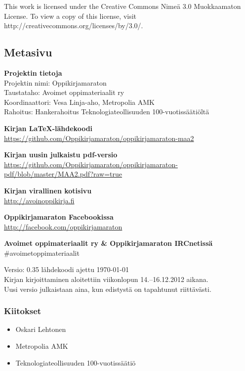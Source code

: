 This work is licensed under the Creative Commons Nimeä 3.0 Muokkaamaton License. To view a copy of this license, visit http://creativecommons.org/licenses/by/3.0/.

\newpage
\subsection*{Metasivu}

\textbf{Projektin tietoja} \\
Projektin nimi: Oppikirjamaraton \\
Taustataho: Avoimet oppimateriaalit ry \\
Koordinaattori: Vesa Linja-aho, Metropolia AMK \\
Rahoitus: Hankerahoitus Teknologiateollisuuden 100-vuotissäätiöltä

\textbf{Kirjan LaTeX-lähdekoodi} \\
\url{https://github.com/Oppikirjamaraton/oppikirjamaraton-maa2}

\textbf{Kirjan uusin julkaistu pdf-versio} \\
\url{https://github.com/Oppikirjamaraton/oppikirjamaraton-pdf/blob/master/MAA2.pdf?raw=true}

\textbf{Kirjan virallinen kotisivu} \\
\url{http://avoinoppikirja.fi}

\textbf{Oppikirjamaraton Facebookissa} \\
\url{http://facebook.com/oppikirjamaraton}

\textbf{Avoimet oppimateriaalit ry \& Oppikirjamaraton IRCnetissä} \\
\#avoimetoppimateriaalit

Versio: 0.35 \qquad lähdekoodi ajettu \today \\
Kirjan kirjoittaminen aloitettiin viikonlopun 14.--16.12.2012 aikana. \\
Uusi versio julkaistaan aina, kun edistystä on tapahtunut riittävästi.

\subsubsection*{Kiitokset}
\begin{itemize}
\item Oskari Lehtonen %
\item Metropolia AMK %
\item Teknologiateollisuuden 100-vuotissäätiö %
\end{itemize}

